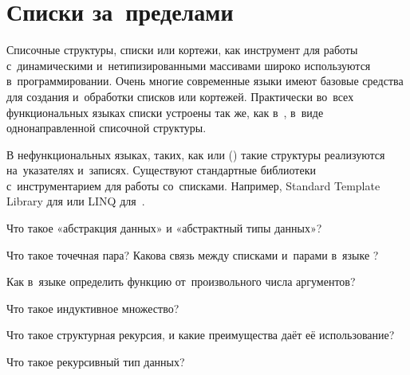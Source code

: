 \section{Списки за~пределами~\Scheme}%
Списочные структуры, списки или кортежи, как инструмент для работы с~динамическими и~нетипизированными массивами широко используются в~программировании. Очень многие современные языки имеют базовые средства для создания и~обработки списков или кортежей. Практически во~всех функциональных языках списки устроены так же, как в~\Scheme, в~виде однонаправленной списочной структуры.

В нефункциональных языках, таких, как  или  () такие структуры реализуются на~указателях и~записях. Существуют стандартные библиотеки с~инструментарием для работы со~списками. Например, Standard Template Library для  или LINQ для~.

\begin{Queeze}

 \item Что такое «абстракция данных» и «абстрактный типы данных»?

 \item Что такое точечная пара? Какова связь между списками и~парами в~языке \Scheme?

 \item Как в~языке \Scheme определить функцию от~произвольного числа аргументов?

 \item Что такое индуктивное множество?

 \item Что такое структурная рекурсия, и какие преимущества даёт её использование?
 
 \item Что такое рекурсивный тип данных?

\end{Queeze}
\endinput